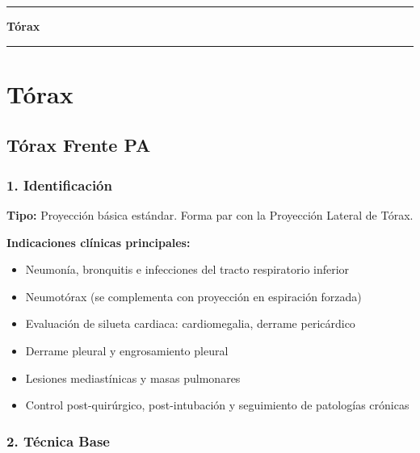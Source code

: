 \clearpage
\onecolumn
\thispagestyle{empty}
\vspace*{\fill}
\begin{center}
	{\color{radblue}\rule{\linewidth}{2pt}}\par
	\vspace{6mm}
	{\Huge\bfseries\color{radblue} Tórax}\par
	\vspace{6mm}
	{\color{radblue}\rule{\linewidth}{2pt}}
\end{center}
\vspace*{\fill}
\clearpage
\twocolumn
\pagestyle{contenido}


	
	\section{Tórax}
	
	\subsection{Tórax Frente PA}
	
	\subsubsection*{1. Identificación}
	
	\textbf{Tipo:} Proyección básica estándar. Forma par con la Proyección Lateral de Tórax.
	
	\textbf{Indicaciones clínicas principales:}
	\begin{itemize}
		\item Neumonía, bronquitis e infecciones del tracto respiratorio inferior
		\item Neumotórax (se complementa con proyección en espiración forzada)
		\item Evaluación de silueta cardiaca: cardiomegalia, derrame pericárdico
		\item Derrame pleural y engrosamiento pleural
		\item Lesiones mediastínicas y masas pulmonares
		\item Control post-quirúrgico, post-intubación y seguimiento de patologías crónicas
	\end{itemize}
	
	\subsubsection*{2. Técnica Base}
	
